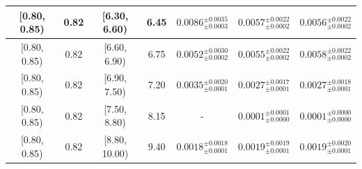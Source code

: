 \begin{longtable}{|c|c|c|c|c|c|c|}
\hline
[0.80, 0.85) & 0.82 & [6.30, 6.60) & 6.45 & $0.0086^{ \pm 0.0035 }_{ \pm 0.0003 }$ & $0.0057^{ \pm 0.0022 }_{ \pm 0.0002 }$ & $0.0056^{ \pm 0.0022 }_{ \pm 0.0002 }$ \\ 
\hline
[0.80, 0.85) & 0.82 & [6.60, 6.90) & 6.75 & $0.0052^{ \pm 0.0030 }_{ \pm 0.0002 }$ & $0.0055^{ \pm 0.0022 }_{ \pm 0.0002 }$ & $0.0058^{ \pm 0.0022 }_{ \pm 0.0002 }$ \\ 
\hline
[0.80, 0.85) & 0.82 & [6.90, 7.50) & 7.20 & $0.0035^{ \pm 0.0020 }_{ \pm 0.0001 }$ & $0.0027^{ \pm 0.0017 }_{ \pm 0.0001 }$ & $0.0027^{ \pm 0.0018 }_{ \pm 0.0001 }$ \\ 
\hline
[0.80, 0.85) & 0.82 & [7.50, 8.80) & 8.15 & - & $0.0001^{ \pm 0.0001 }_{ \pm 0.0000 }$ & $0.0001^{ \pm 0.0000 }_{ \pm 0.0000 }$ \\ 
\hline
[0.80, 0.85) & 0.82 & [8.80, 10.00) & 9.40 & $0.0018^{ \pm 0.0018 }_{ \pm 0.0001 }$ & $0.0019^{ \pm 0.0019 }_{ \pm 0.0001 }$ & $0.0019^{ \pm 0.0020 }_{ \pm 0.0001 }$ \\ 
\hline
\end{longtable}
\endgroup
